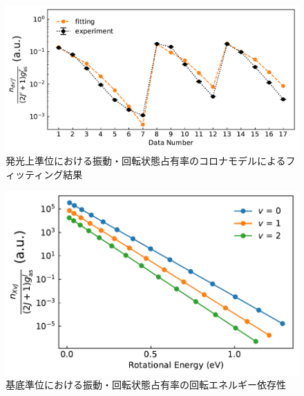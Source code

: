 \begin{figure}
    \centering
    \includegraphics[width=15cm]{pictures/fitting-result.pdf}
    \caption{発光上準位における振動・回転状態占有率のコロナモデルによるフィッティング結果}
    \label{fig:fitting-result}
\end{figure}

\begin{figure}
    \centering
    \includegraphics[width=15cm]{pictures/ground-state-n.pdf}
    \caption{基底準位における振動・回転状態占有率の回転エネルギー依存性}
    \label{fig:ground-state-n}
\end{figure}

